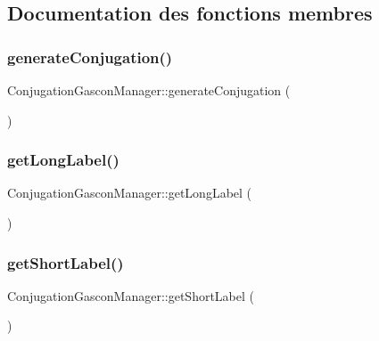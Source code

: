 \subsection{Documentation des fonctions membres}
\hypertarget{class_conjugation_gascon_manager_a2730ac29ac0ba6fd56c5896cefa297ac}{}\label{class_conjugation_gascon_manager_a2730ac29ac0ba6fd56c5896cefa297ac} 
\subsubsection{\texorpdfstring{generate\+Conjugation()}{generateConjugation()}}
{\footnotesize\ttfamily Conjugation\+Gascon\+Manager\+::generate\+Conjugation (\begin{DoxyParamCaption}{ }\end{DoxyParamCaption})}

\hypertarget{class_conjugation_gascon_manager_a5fc41ec1f99e255a8c57c7b7f382bc95}{}\label{class_conjugation_gascon_manager_a5fc41ec1f99e255a8c57c7b7f382bc95} 
\subsubsection{\texorpdfstring{get\+Long\+Label()}{getLongLabel()}}
{\footnotesize\ttfamily Conjugation\+Gascon\+Manager\+::get\+Long\+Label (\begin{DoxyParamCaption}{ }\end{DoxyParamCaption})}

\hypertarget{class_conjugation_gascon_manager_a958775fb06109e0cea145f53308482b2}{}\label{class_conjugation_gascon_manager_a958775fb06109e0cea145f53308482b2} 
\subsubsection{\texorpdfstring{get\+Short\+Label()}{getShortLabel()}}
{\footnotesize\ttfamily Conjugation\+Gascon\+Manager\+::get\+Short\+Label (\begin{DoxyParamCaption}{ }\end{DoxyParamCaption})}

